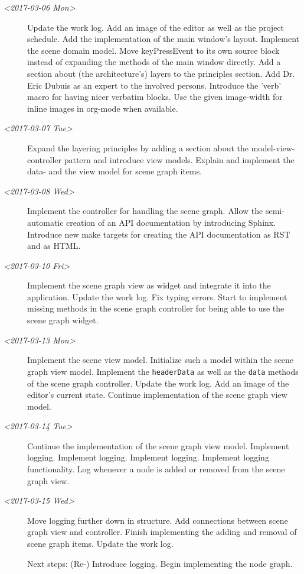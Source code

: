 \documentclass[10pt, openright, notitlepage]{scrreprt}
\begin{document}
\begin{description}
\item[{\textit{<2017-03-06 Mon>}}] Update the work log. Add an image of the editor as well as
the project schedule. Add the implementation of the main window's layout.
Implement the scene domain model. Move keyPressEvent to its own source
block instead of expanding the methods of the main window directly. Add a
section about (the architecture's) layers to the principles section. Add
Dr. Eric Dubuis as an expert to the involved persons. Introduce the 'verb'
macro for having nicer verbatim blocks. Use the given image-width for
inline images in org-mode when available.

\item[{\textit{<2017-03-07 Tue>}}] Expand the layering principles by adding a section about
the model-view-controller pattern and introduce view models. Explain and
implement the data- and the view model for scene graph items.

\item[{\textit{<2017-03-08 Wed>}}] Implement the controller for handling the scene graph.
Allow the semi-automatic creation of an API documentation by introducing
Sphinx. Introduce new make targets for creating the API documentation as
RST and as HTML.

\item[{\textit{<2017-03-10 Fri>}}] Implement the scene graph view as widget and integrate it
into the application. Update the work log. Fix typing errors. Start to
implement missing methods in the scene graph controller for being able to
use the scene graph widget.

\item[{\textit{<2017-03-13 Mon>}}] Implement the scene view model. Initialize such a model
within the scene graph view model. Implement the \texttt{headerData} as well as
the \texttt{data} methods of the scene graph controller. Update the work log. Add
an image of the editor's current state. Continue implementation of the
scene graph view model.

\item[{\textit{<2017-03-14 Tue>}}] Continue the implementation of the scene graph view model.
Implement logging. Implement logging. Implement logging. Implement logging
functionality. Log whenever a node is added or removed from the scene graph
view.

\item[{\textit{<2017-03-15 Wed>}}] Move logging further down in structure. Add connections
between scene graph view and controller. Finish implementing the adding and
removal of scene graph items. Update the work log.

Next steps: (Re-) Introduce logging. Begin implementing the node graph.
\end{description}
\end{document}
